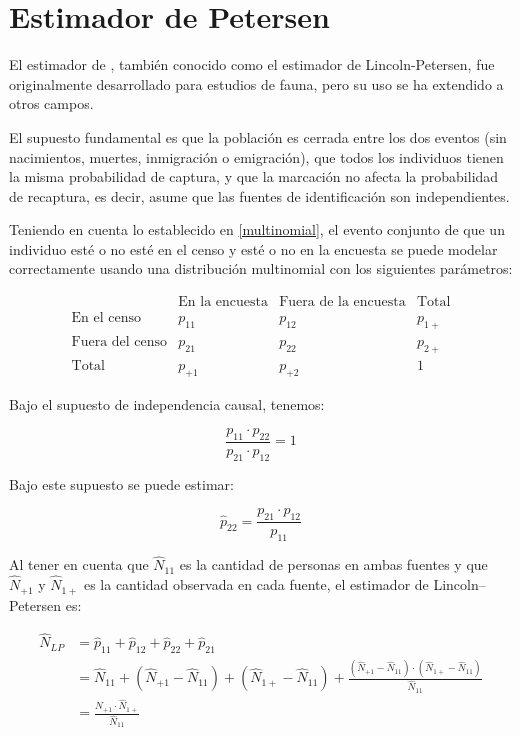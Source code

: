 \documentclass[
  12pt,
]{book}
\begin{document}
\section{Estimador de Petersen}\label{estimador-de-petersen}

El estimador de \citet{petersen1896}, también conocido como el estimador de Lincoln-Petersen, fue originalmente desarrollado para estudios de fauna, pero su uso se ha extendido a otros campos.

El supuesto fundamental es que la población es cerrada entre los dos eventos (sin nacimientos, muertes, inmigración o emigración), que todos los individuos tienen la misma probabilidad de captura, y que la marcación no afecta la probabilidad de recaptura, es decir, asume que las fuentes de identificación son independientes.

Teniendo en cuenta lo establecido en \ref{multinomial}, el evento conjunto de que un individuo esté o no esté en el censo y esté o no en la encuesta se puede modelar correctamente usando una distribución multinomial con los siguientes parámetros:

\[
    \begin{array}{c|cc|c}
    & \text{En la encuesta} & \text{Fuera de la encuesta} & \text{Total} \\
    \hline
    \text{En el censo} & p_{11} & p_{12} & p_{1+} \\
    \text{Fuera del censo} & p_{21} & p_{22} & p_{2+} \\
    \hline
    \text{Total} & p_{+1} & p_{+2} & 1
    \end{array}
    \]

Bajo el supuesto de independencia causal, tenemos:

\[\frac{p_{11} \cdot p_{22}}{p_{21} \cdot  p_{12}} = 1\]

Bajo este supuesto se puede estimar:

\[ \hat{p}_{22} = \frac{p_{21}\cdot p_{12}}{p_{11}} \]

Al tener en cuenta que \(\hat{N}_{11}\) es la cantidad de personas en ambas fuentes y que \(\hat{N}_{+1}\) y \(\hat{N}_{1+}\) es la cantidad observada en cada fuente, el estimador de Lincoln--Petersen es:

\begin{align}
\hat{N}_{LP} &= \hat{p}_{11} + \hat{p}_{12} + \hat{p}_{22} + \hat{p}_{21} \\ 
             &= \hat{N}_{11} + (\hat{N}_{+1} - \hat{N}_{11}) + (\hat{N}_{1+} - \hat{N}_{11}) + \frac{(\hat{N}_{+1} - \hat{N}_{11}) \cdot (\hat{N}_{1+} - \hat{N}_{11})}{\hat{N}_{11}} \\
             &= \frac{\hat{N}_{+1} \cdot \hat{N}_{1+}}{\hat{N}_{11}}
             
\end{align}
\end{document}
